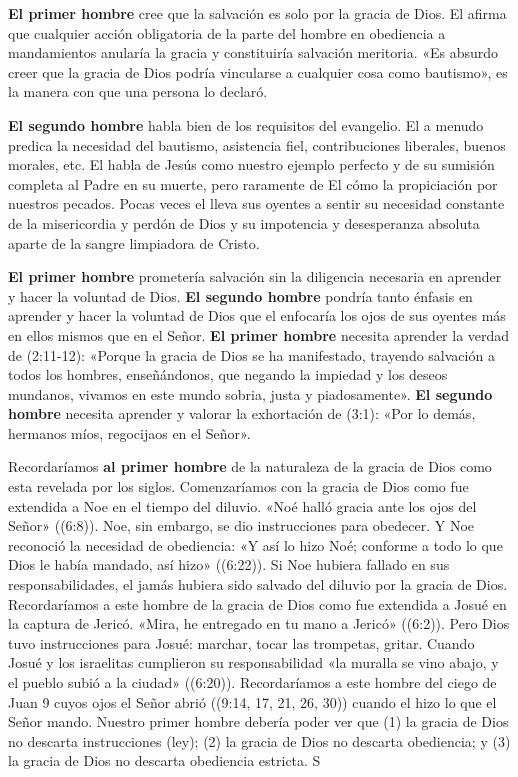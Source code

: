 \documentclass[12pt, twoside, openright]{book}
\begin{document}
\textbf{El primer hombre} cree que la salvación es solo por la gracia de Dios. El afirma que cualquier acción obligatoria de la parte del hombre en obediencia a mandamientos anularía la gracia y constituiría salvación meritoria. «Es absurdo creer que la gracia de Dios podría vincularse a cualquier cosa como bautismo», es la manera con que una persona lo declaró. 

\textbf{El segundo hombre} habla bien de los requisitos del evangelio. El a menudo predica la necesidad del bautismo, asistencia fiel, contribuciones liberales, buenos morales, etc. El habla de Jesús como nuestro ejemplo perfecto y de su sumisión completa al Padre en su muerte, pero raramente de El cómo la propiciación por nuestros pecados. Pocas veces el lleva sus oyentes a sentir su necesidad constante de la misericordia y perdón de Dios y su impotencia y desesperanza absoluta aparte de la sangre limpiadora de Cristo. 

\textbf{El primer hombre} prometería salvación sin la diligencia necesaria en aprender y hacer la voluntad de Dios. \textbf{El segundo hombre} pondría tanto énfasis en aprender y hacer la voluntad de Dios que el enfocaría los ojos de sus oyentes más en ellos mismos que en el Señor. \textbf{El primer hombre} necesita aprender la verdad de (2:11-12): «Porque la gracia de Dios se ha manifestado, trayendo salvación a todos los hombres, enseñándonos, que negando la impiedad y los deseos mundanos, vivamos en este mundo sobria, justa y piadosamente». \textbf{El segundo hombre} necesita aprender y valorar la exhortación de (3:1): «Por lo demás, hermanos míos, regocijaos en el Señor».

Recordaríamos \textbf{al primer hombre} de la naturaleza de la gracia de Dios como esta revelada por los siglos. Comenzaríamos con la gracia de Dios como fue extendida a Noe en el tiempo del diluvio. «Noé halló gracia ante los ojos del Señor» ((6:8)). Noe, sin embargo, se dio instrucciones para obedecer. Y Noe reconoció la necesidad de obediencia: «Y así lo hizo Noé; conforme a todo lo que Dios le había mandado, así hizo» ((6:22)). Si Noe hubiera fallado en sus responsabilidades, el jamás hubiera sido salvado del diluvio por la gracia de Dios. Recordaríamos a este hombre de la gracia de Dios como fue extendida a Josué en la captura de Jericó. «Mira, he entregado en tu mano a Jericó» ((6:2)). Pero Dios tuvo instrucciones para Josué: marchar, tocar las trompetas, gritar. Cuando Josué y los israelitas cumplieron su responsabilidad «la muralla se vino abajo, y el pueblo subió a la ciudad» ((6:20)). Recordaríamos a este hombre del ciego de Juan 9 cuyos ojos el Señor abrió ((9:14, 17, 21, 26, 30)) cuando el hizo lo que el Señor mando. Nuestro primer hombre debería poder ver que (1) la gracia de Dios no descarta instrucciones (ley); (2) la gracia de Dios no descarta obediencia; y (3) la gracia de Dios no descarta obediencia estricta. S
\end{document}
